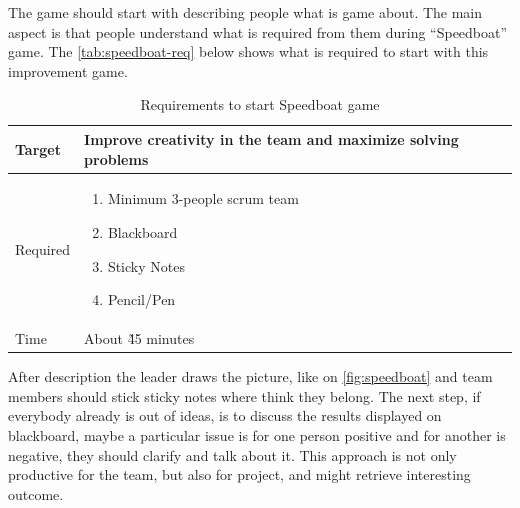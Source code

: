 The game should start with describing people what is game about. The main aspect is that people understand what is required from them during “Speedboat” game. The \autoref{tab:speedboat-req} below shows what is required to start with this improvement game.

\begin{table}[h]
	\caption{Requirements to start Speedboat game}
	\label{tab:speedboat-req}
	\begin{tabularx}{\textwidth}{|X|X|}
	\hline
		Target & Improve creativity in the team and maximize solving problems  \\ \hline
		Required			& \begin{enumerate}
		    \item Minimum 3-people scrum team
		    \item Blackboard
		    \item Sticky Notes
		    \item Pencil/Pen
		\end{enumerate}	 \\ \hline
		Time			& About \~45 minutes	 \\ \hline

	\end{tabularx}
\end{table}

After description the leader draws the picture, like on  \autoref{fig:speedboat} and team members should stick sticky notes where think they belong. The next step, if everybody already is out of ideas, is to discuss the results displayed on blackboard, maybe a particular issue is for one person positive and for another is negative, they should clarify and talk about it. This approach is not only productive for the team, but also for project, and might retrieve interesting outcome.

